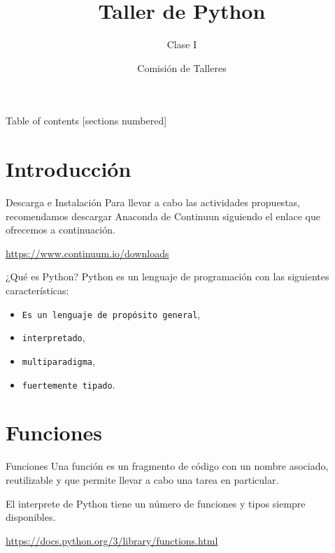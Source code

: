 \documentclass[10pt]{beamer}
\title{Taller de Python}
\subtitle{Clase I}
\date{}
\author{Comisión de Talleres}
\institute{Centro de Estudiantes Tecnológicos}
\begin{document}
\maketitle

\begin{frame}{Table of contents}
  [sections numbered]
  \tableofcontents[hideallsubsections]
\end{frame}

\section{Introducción}
\begin{frame}[fragile]{Descarga e Instalación}
Para llevar a cabo las actividades propuestas, recomendamos descargar \alert{Anaconda} de Continuun siguiendo el enlace que ofrecemos a continuación.
\vspace{1em}
\begin{center}
	\url{https://www.continuum.io/downloads}
\end{center}
\end{frame}

\begin{frame}{¿Qué es Python?}
Python es un \alert{lenguaje de programación} con las siguientes características:

\begin{itemize}[<+(1)- | alert@+>]
	\item \texttt{Es un lenguaje de propósito general},
	\item \texttt{interpretado},
	\item \texttt{multiparadigma},
	\item \texttt{fuertemente tipado}.
\end{itemize}

\begin{center}
\end{center}
\end{frame}

\section{Funciones}
\begin{frame}[fragile]{Funciones}
\alert{Una función es un fragmento de código con un nombre asociado, reutilizable y que permite llevar a cabo una tarea en particular.}

\vspace{1em}

El interprete de Python tiene un número de funciones y tipos siempre disponibles. 
	
\begin{center}
\url{https://docs.python.org/3/library/functions.html}
\end{center}
\end{frame}
\end{document}
